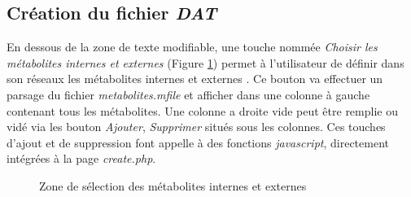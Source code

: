 \subsection{Création du fichier \emph{DAT}}

En dessous de la zone de texte modifiable, une touche nommée \emph{Choisir les métabolites internes et externes} (Figure \ref{boutonMET_int_EXT}) permet à l'utilisateur de définir dans son réseaux les métabolites internes et externes . Ce bouton va effectuer un parsage du fichier \emph{metabolites.mfile} et afficher dans une colonne à gauche contenant tous les métabolites. Une colonne a droite vide peut être remplie ou vidé via les bouton \emph{Ajouter}, \emph{Supprimer} situés sous les colonnes.
Ces touches d'ajout et de suppression font appelle à des fonctions \emph{javascript}, directement intégrées à la page \emph{create.php}.\\

\begin{figure}[!ht]
    \begin{center}
        \caption{Zone de sélection des métabolites internes et externes}
          \label{boutonMET_int_EXT}
      \end{center}   
\end{figure}

